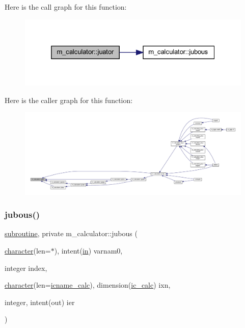 Here is the call graph for this function\+:
\nopagebreak
\begin{figure}[H]
\begin{center}
\leavevmode
\includegraphics[width=325pt]{namespacem__calculator_a99dafdeb0fe1a589face7a3eaf5c66bd_cgraph}
\end{center}
\end{figure}
Here is the caller graph for this function\+:
\nopagebreak
\begin{figure}[H]
\begin{center}
\leavevmode
\includegraphics[width=350pt]{namespacem__calculator_a99dafdeb0fe1a589face7a3eaf5c66bd_icgraph}
\end{center}
\end{figure}
\mbox{\label{namespacem__calculator_a82912c44b358ca053754669f542d80af}} 
\subsubsection{\texorpdfstring{jubous()}{jubous()}}
{\footnotesize\ttfamily \hyperlink{M__stopwatch_83_8txt_acfbcff50169d691ff02d4a123ed70482}{subroutine}, private m\+\_\+calculator\+::jubous (\begin{DoxyParamCaption}\item[{\hyperlink{option__stopwatch_83_8txt_abd4b21fbbd175834027b5224bfe97e66}{character}(len=$\ast$), intent(\hyperlink{M__journal_83_8txt_afce72651d1eed785a2132bee863b2f38}{in})}]{varnam0,  }\item[{integer}]{index,  }\item[{\hyperlink{option__stopwatch_83_8txt_abd4b21fbbd175834027b5224bfe97e66}{character}(len=\hyperlink{namespacem__calculator_a482f8880712dc8f52ef6833de3243875}{icname\+\_\+calc}), dimension(\hyperlink{namespacem__calculator_a462e5bf8d038196149ba96c22a614284}{ic\+\_\+calc})}]{ixn,  }\item[{integer, intent(out)}]{ier }\end{DoxyParamCaption})\hspace{0.3cm}{\ttfamily [private]}}



